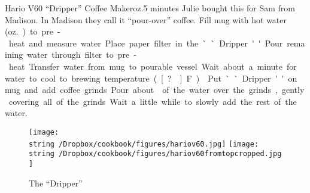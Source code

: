 \begin{recipe}{Hario V60\tm{} ``Dripper'' Coffee Maker}{\unit[6--8]{oz.}}{5 minutes}
\freeform Julie bought this for Sam from Madison.  In Madison they
call it ``pour-over'' coffee.
 Fill mug with hot water
(\unit[6--8]{oz.}) to pre-heat and measure water.  Place paper filter in the
``Dripper.'' Pour remaining water through filter to pre-heat.
Transfer water from mug to pourable vessel.  Wait about a minute for water to cool to brewing temperature (\unit[?\0]{F}).
 Put ``Dripper'' on mug and add coffee
grinds.  Pour about  of the water over the grinds, gently
covering all of the grinds.  Wait a little while to slowly add the
rest of the water.
\end{recipe}
\begin{figure}[b!]
\begin{center}
\texttt{[image: \\string~/Dropbox/cookbook/figures/hariov60.jpg]}
\hspace{0.1\textwidth}
\texttt{[image: \\string~/Dropbox/cookbook/figures/hariov60fromtopcropped.jpg]}
\end{center}
\caption*{The ``Dripper'' }
\end{figure}
